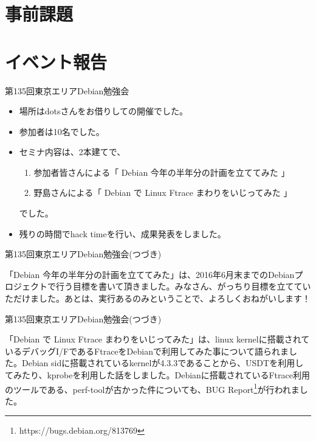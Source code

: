 \section{事前課題}
{\footnotesize
 
}

\section{イベント報告}

\begin{frame}{第135回東京エリアDebian勉強会 }

\begin{itemize}
\item 場所はdotsさんをお借りしての開催でした。
\item 参加者は10名でした。
\item セミナ内容は、2本建てで、
  \begin{enumerate}
  \item 参加者皆さんによる「 Debian 今年の半年分の計画を立ててみた 」
  \item 野島さんによる「 Debian で Linux Ftrace まわりをいじってみた  」
  \end{enumerate}
でした。
\item 残りの時間でhack timeを行い、成果発表をしました。
\end{itemize} 
\end{frame}

\begin{frame}{第135回東京エリアDebian勉強会(つづき)}

  「Debian 今年の半年分の計画を立ててみた」は、2016年6月末までのDebianプロジェクトで行う目標を書いて頂きました。みなさん、がっちり目標を立てていただけました。あとは、実行あるのみということで、よろしくおねがいします！

\end{frame}

\begin{frame}{第135回東京エリアDebian勉強会(つづき)}

  「Debian で Linux Ftrace まわりをいじってみた」は、linux kernelに搭載されているデバッグI/FであるFtraceをDebianで利用してみた事について語られました。Debian sidに搭載されているkernelが4.3.3であることから、USDTを利用してみたり、kprobeを利用した話をしました。Debianに搭載されているFtrace利用のツールである、perf-toolが古かった件についても、BUG Report\footnote{https://bugs.debian.org/813769}が行われました。

\end{frame}


